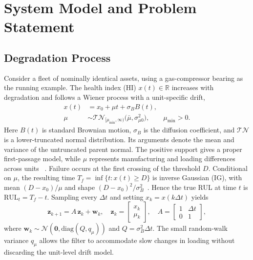 \documentclass[journal]{IEEEtran}
\newcommand{\R}{\mathbb{R}}
\newcommand{\rul}{\mathrm{RUL}}
\begin{document}
\section{System Model and Problem Statement}\label{sec:model}

\subsection{Degradation Process}
Consider a fleet of nominally identical assets, using a gas-compressor bearing
as the running example. The health index (HI) $x(t)\in\R$ increases with
degradation and follows a Wiener process with a unit-specific drift,
\begin{equation}\label{eq:wiener}
\begin{aligned}
x(t)&=x_0+\mu t+\sigma_B B(t),\\
\mu&\sim\mathcal{TN}_{[\mu_{\min},\infty)}
\!\bigl(\bar\mu,\sigma_{\mu0}^{2}\bigr),\qquad \mu_{\min}>0.
\end{aligned}
\end{equation}
Here $B(t)$ is standard Brownian motion, $\sigma_B$ is the diffusion
coefficient, and $\mathcal{TN}$ is a lower-truncated normal distribution. Its
arguments denote the mean and variance of the untruncated parent normal. The
positive support gives a proper first-passage model, while $\mu$ represents
manufacturing and loading differences across units
~\cite{si2014,huang2015,zhai2017}. Failure occurs at the first crossing of the
threshold $D$. Conditional on $\mu$, the resulting time
$T_f=\inf\{t:x(t)\geq D\}$ is inverse Gaussian (IG), with mean
$(D-x_0)/\mu$ and shape $(D-x_0)^2/\sigma_B^{2}$~\cite{si2014}. Hence the
true RUL at time $t$ is $\rul_t=T_f-t$. Sampling every $\Delta t$ and setting
$x_k=x(k\Delta t)$ yields
\begin{equation}\label{eq:ss}
\mathbf{z}_{k+1}=A\,\mathbf{z}_k+\mathbf{w}_k,\quad
\mathbf{z}_k=\begin{bmatrix}x_k\\ \mu_k\end{bmatrix},\quad
A=\begin{bmatrix}1 & \Delta t\\ 0 & 1\end{bmatrix},
\end{equation}
where $\mathbf{w}_k\sim\mathcal{N}(\mathbf{0},\mathrm{diag}(Q,q_\mu))$ and
$Q=\sigma_B^{2}\Delta t$. The small random-walk variance $q_\mu$ allows the
filter to accommodate slow changes in loading without discarding the
unit-level drift model.
\end{document}
